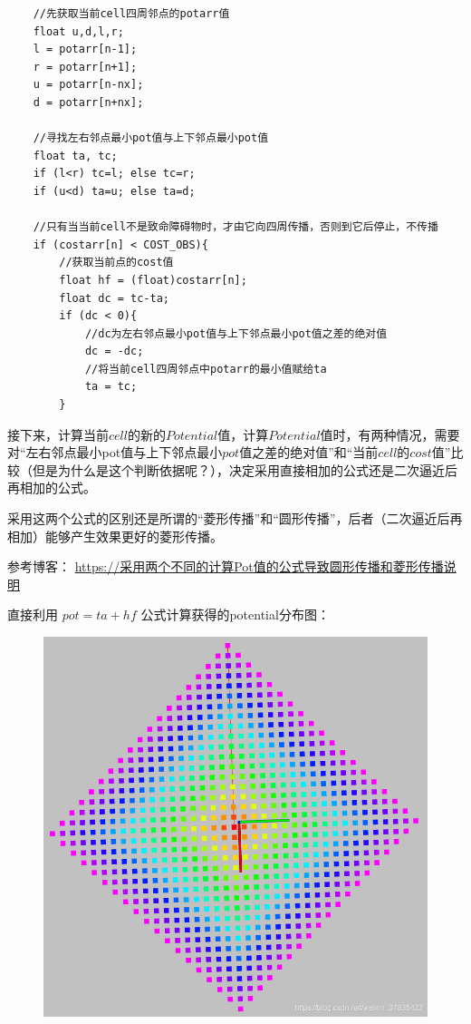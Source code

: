 \documentclass[9pt, oneside]{book}
\begin{document}
\begin{verbatim}
    //先获取当前cell四周邻点的potarr值
    float u,d,l,r;
    l = potarr[n-1];
    r = potarr[n+1];		
    u = potarr[n-nx];
    d = potarr[n+nx];

    //寻找左右邻点最小pot值与上下邻点最小pot值
    float ta, tc;
    if (l<r) tc=l; else tc=r;
    if (u<d) ta=u; else ta=d;

    //只有当当前cell不是致命障碍物时，才由它向四周传播，否则到它后停止，不传播
    if (costarr[n] < COST_OBS){
        //获取当前点的cost值
        float hf = (float)costarr[n];
        float dc = tc-ta;
        if (dc < 0){
            //dc为左右邻点最小pot值与上下邻点最小pot值之差的绝对值
            dc = -dc;
            //将当前cell四周邻点中potarr的最小值赋给ta
            ta = tc;
        }
\end{verbatim}

接下来，计算当前$cell$的新的$Potential$值，计算$Potential$值时，有两种情况，需要对“左右邻点最小pot值与上下邻点最小$pot$值之差的绝对值”和“当前$cell$的$cost$值”比较（但是为什么是这个判断依据呢？），决定采用直接相加的公式还是二次逼近后再相加的公式。

采用这两个公式的区别还是所谓的“菱形传播”和“圆形传播”，后者（二次逼近后再相加）能够产生效果更好的菱形传播。

参考博客：
\href{https://blog.csdn.net/weixin_37835423/article/details/102996256?spm=1001.2101.3001.6650.5&utm_medium=distribute.pc_relevant.none-task-blog-2%7Edefault%7EBlogCommendFromBaidu%7Edefault-5.no_search_link&depth_1-utm_source=distribute.pc_relevant.none-task-blog-2%7Edefault%7EBlogCommendFromBaidu%7Edefault-5.no_search_link}{https://采用两个不同的计算Pot值的公式导致圆形传播和菱形传播说明}

直接利用 $pot = ta+hf$ 公式计算获得的potential分布图：

\begin{figure}[H]
    \centering
    \includegraphics[width=0.5\linewidth]{image/pot_simple_equation.png}
\end{figure}
\end{document}
